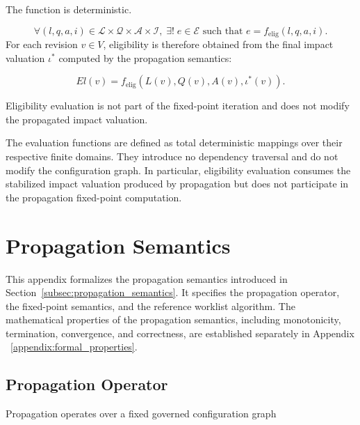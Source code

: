 \documentclass[10pt]{article}
\begin{document}
The function is deterministic.

\begin{equation}
	\forall
	(l,q,a,i)
	\in
	\mathcal{L}
	\times
	\mathcal{Q}
	\times
	\mathcal{A}
	\times
	\mathcal{I},
	\;
	\exists!\;
	e
	\in
	\mathcal{E}
	\text{ such that }
	e
	=
	f_{\mathrm{elig}}(l,q,a,i).
	\label{eq:eligibility_deterministic}
\end{equation}
For each revision $v\in V$, eligibility is therefore obtained from the final
impact valuation $\iota^{*}$ computed by the propagation semantics:

\begin{equation}
	El(v)
	=
	f_{\mathrm{elig}}
	\left(
	L(v),
	Q(v),
	A(v),
	\iota^{*}(v)
	\right).
	\label{eq:eligibility_from_fixed_impact}
\end{equation}

Eligibility evaluation is not part of the fixed-point iteration and does not modify the propagated impact valuation.

The evaluation functions are defined as total deterministic mappings over their respective finite domains. They introduce no dependency traversal and do not modify the configuration graph. In particular, eligibility evaluation consumes the stabilized impact valuation produced by propagation but does not participate in the propagation fixed-point computation.

\section{Propagation Semantics}
\label{appendix:propagation_semantics}

This appendix formalizes the propagation semantics introduced in
Section~\ref{subsec:propagation_semantics}. It specifies the propagation operator, the fixed-point semantics, and the reference worklist algorithm.
The mathematical properties of the propagation semantics, including monotonicity, termination, convergence, and correctness, are established separately in Appendix ~\ref{appendix:formal_properties}.

\subsection{Propagation Operator}

Propagation operates over a fixed governed configuration graph
\end{document}
